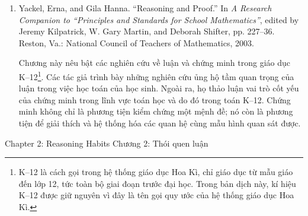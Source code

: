 {{\begin{enumerate}
          \par\noindent\hspace*{1em} Trong nghiên cứu này về quan niệm của giáo viên toán bậc trung học đối với chứng minh, Knuth trình bày một khung lí thuyết nhằm giúp hiểu vai trò của chứng minh trong toán học nhà trường. Khung lí thuyết này dựa trên các nghiên cứu khác và cung cấp một cách hữu ích để suy nghĩ về mục đích của chứng minh trong chương trình học toán. Theo khung của Knuth, chứng minh là cơ chế để kiểm chứng và giải thích mệnh đề đúng, giao tiếp toán học, tạo ra và khám phá ý tưởng toán học mới, đồng thời tổ chức ý tưởng sao cho chúng trở thành một phần của cấu trúc tiên đề.\vspace{.35\baselineskip}

        \item Yackel, Erna, and Gila Hanna. ``Reasoning and Proof.'' In \emph{A Research Companion to ``Principles and Standards for School Mathematics''}, edited by Jeremy Kilpatrick, W. Gary Martin, and Deborah Shifter, pp. 227--36. Reston, Va.: National Council of Teachers of Mathematics, 2003.\vspace{.25\baselineskip}

          \par\noindent\hspace*{1em} Chương này nêu bật các nghiên cứu về luận và chứng minh trong giáo dục K--12\footnote{K--12 là cách gọi trong hệ thống giáo dục Hoa Kì, chỉ giáo dục từ mẫu giáo đến lớp 12, tức toàn bộ giai đoạn trước đại học. Trong bản dịch này, kí hiệu K--12 được giữ nguyên vì đây là tên gọi quy ước của hệ thống giáo dục Hoa Kì.}. Các tác giả trình bày những nghiên cứu ủng hộ tầm quan trọng của luận trong việc học toán của học sinh. Ngoài ra, họ thảo luận vai trò cốt yếu của chứng minh trong lĩnh vực toán học và do đó trong toán K--12. Chứng minh không chỉ là phương tiện kiểm chứng một mệnh đề; nó còn là phương tiện để giải thích và hệ thống hóa các quan hệ cùng mẫu hình quan sát được.
      \end{enumerate}}
  }{\NOTE{}}

\clearpage
\ParallelSection
  {Chapter 2: Reasoning Habits}
  {Chương 2: Thói quen luận}
  {}

